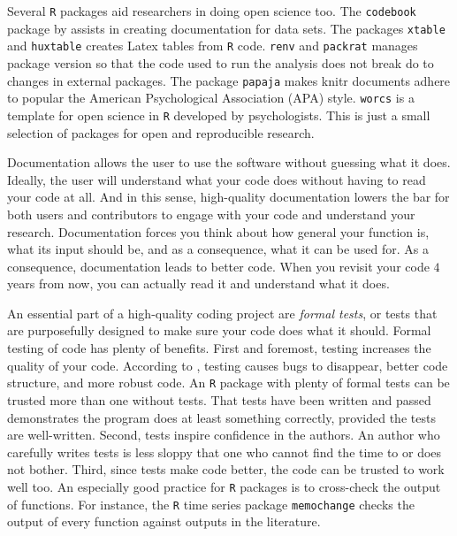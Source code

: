 Several \texttt{R} packages aid researchers in doing open science too. The \texttt{codebook} package by \textcite{Arslan2019-tg} assists in creating documentation for data sets. The packages \texttt{xtable} \parencite{xtable} and \texttt{huxtable} \parencite{huxtable} creates Latex tables from \texttt{R} code. \texttt{renv} \parencite{renv} and \texttt{packrat} \parencite{packrat} manages package version so that the code used to run the analysis does not break do to changes in external packages. The package \texttt{papaja} \parencite{papaja} makes knitr documents adhere to popular the American Psychological Association (APA) style. \texttt{worcs} \parencite{Van_Lissa2020-sb} is a template for open science in \texttt{R} developed by psychologists. This is just a small selection of packages for open and reproducible research.

Documentation allows the user to use the software without guessing what it does. Ideally, the user will understand what your code does without having to read your code at all. And in this sense, high-quality documentation lowers the bar for both users and contributors to engage with your code and understand your research. Documentation forces you think about how general your function is, what its input should be, and as a consequence, what it can be used for. As a consequence, documentation leads to better code. When you revisit your code $4$ years from now, you can actually read it and understand what it does. 

An essential part of a high-quality coding project are \emph{formal tests}, or tests that are purposefully designed to make sure your code does what it should. Formal testing of code has plenty of benefits. First and foremost, testing increases the quality of your code. According to \textcite[Chapter 7]{Wickham2015-ik}, testing causes bugs to disappear, better code structure, and more robust code. An \texttt{R} package with plenty of formal tests can be trusted more than one without tests. That tests have been written and passed demonstrates the program does at least something correctly, provided the tests are well-written. Second, tests inspire confidence in the authors. An author who carefully writes tests is less sloppy that one who cannot find the time to or does not bother. Third, since tests make code better, the code can be trusted to work well too. An especially good practice for \texttt{R} packages is to cross-check the output of functions. For instance, the \texttt{R} time series package \texttt{memochange} \parencite{memochange} checks the output of every function against outputs in the literature.

